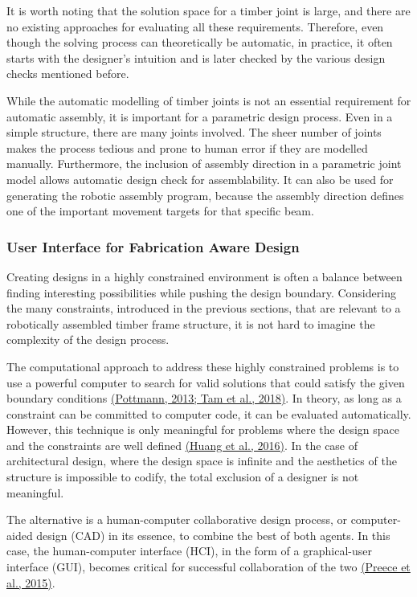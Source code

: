 \documentclass[11pt]{book}
\begin{document}
It is worth noting that the solution space for a timber joint is large, and there are no existing approaches for evaluating all these requirements. Therefore, even though the solving process can theoretically be automatic, in practice, it often starts with the designer’s intuition and is later checked by the various design checks mentioned before. 

While the automatic modelling of timber joints is not an essential requirement for automatic assembly, it is important for a parametric design process. Even in a simple structure, there are many joints involved. The sheer number of joints makes the process tedious and prone to human error if they are modelled manually. Furthermore, the inclusion of assembly direction in a parametric joint model allows automatic design check for assemblability. It can also be used for generating the robotic assembly program, because the assembly direction defines one of the important movement targets for that specific beam. 

\subsubsection{User Interface for Fabrication Aware Design}

Creating designs in a highly constrained environment is often a balance between finding interesting possibilities while pushing the design boundary. Considering the many constraints, introduced in the previous sections, that are relevant to a robotically assembled timber frame structure, it is not hard to imagine the complexity of the design process. 

The computational approach to address these highly constrained problems is to use a powerful computer to search for valid solutions that could satisfy the given boundary conditions \href{https://www.zotero.org/google-docs/?IhApCE}{(Pottmann, 2013; Tam et al., 2018)}. In theory, as long as a constraint can be committed to computer code, it can be evaluated automatically. However, this technique is only meaningful for problems where the design space and the constraints are well defined \href{https://www.zotero.org/google-docs/?5kfhGC}{(Huang et al., 2016)}. In the case of architectural design, where the design space is infinite and the aesthetics of the structure is impossible to codify, the total exclusion of a designer is not meaningful. 

The alternative is a human-computer collaborative design process, or computer-aided design (CAD) in its essence, to combine the best of both agents. In this case, the human-computer interface (HCI), in the form of a graphical-user interface (GUI), becomes critical for successful collaboration of the two \href{https://www.zotero.org/google-docs/?3vtUPQ}{(Preece et al., 2015)}. 
\end{document}
